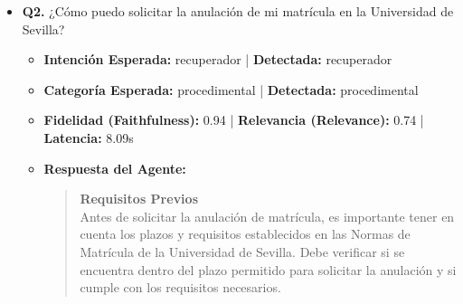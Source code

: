 \documentclass[12pt,a4paper,oneside]{report}
\begin{document}
\begin{itemize}
\item \textbf{Q2.} ¿Cómo puedo solicitar la anulación de mi matrícula en la Universidad de Sevilla? \\
        \begin{itemize}
          \item \textbf{Intención Esperada:} recuperador | \textbf{Detectada:} recuperador
          \item \textbf{Categoría Esperada:} procedimental | \textbf{Detectada:} procedimental
          \item \textbf{Fidelidad (Faithfulness):} 0.94 | \textbf{Relevancia (Relevance):} 0.74 | \textbf{Latencia:} 8.09s
          \item \textbf{{Respuesta del Agente:}} \\
                \begin{quote}

\noindent\textbf{Requisitos Previos}\\
Antes de solicitar la anulación de matrícula, es importante tener en cuenta los plazos y requisitos establecidos en las Normas de Matrícula de la Universidad de Sevilla. Debe verificar si se encuentra dentro del plazo permitido para solicitar la anulación y si cumple con los requisitos necesarios.



\end{quote}
\end{itemize}
\end{itemize}
\end{document}
